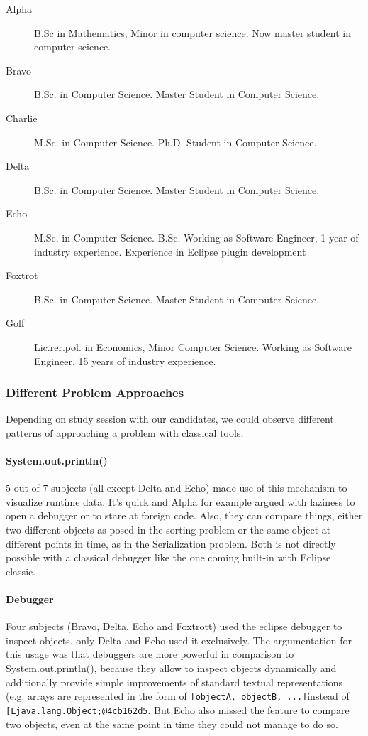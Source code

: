 \documentclass[english]{acm_proc_article-sp}
\newcommand\nes[1]{\nbc{nes}{#1}{blue}}
\begin{document}
\nes{Todo: reduce white space.}
\begin{description}
\item [{Alpha}] B.Sc in Mathematics, Minor in computer science. Now master student in computer science. %
\item [{Bravo}] B.Sc. in Computer Science. Master Student  in Computer Science.
\item [{Charlie}] M.Sc. in Computer Science. Ph.D. Student in Computer Science.
\item [{Delta}] B.Sc. in Computer Science. Master Student  in Computer Science.
\item [{Echo}] M.Sc. in Computer Science. B.Sc. Working as Software Engineer, 1 year of industry experience. Experience in Eclipse plugin development
\item [{Foxtrot}] B.Sc. in Computer Science. Master Student  in Computer Science.
\item [{Golf}] Lic.rer.pol. in Economics, Minor Computer Science. Working as Software Engineer, 15 years of industry experience. %
\end{description}

\subsubsection{Different Problem Approaches}
Depending on study session with our candidates, we could observe different patterns of approaching a problem with classical tools.
\paragraph{System.out.println()}
5 out of 7 subjects (all except Delta and Echo) made use of this mechanism to visualize runtime data. 
It's quick and Alpha for example argued with laziness to open a debugger or to stare at foreign code. 
Also, they can compare things, either two different objects as posed in the sorting problem or the same object at different points in time, as in the Serialization problem. 
Both is not directly possible with a classical debugger like the one coming built-in with Eclipse classic.
\paragraph{Debugger}
Four subjects (Bravo, Delta, Echo and Foxtrott) used the eclipse debugger to inspect objects, only Delta and Echo used it exclusively. 
The argumentation for this usage was that debuggers are more powerful in comparison to System.out.println(), because they allow to inspect objects dynamically and additionally provide simple improvements of standard textual representations (e.g. 
arrays are represented in the form of \texttt{[objectA, objectB, ...]}instead of \texttt{[Ljava.lang.Object;@4cb162d5}. 
But Echo also missed the feature to compare two objects, even at the same point in time they could not manage to do so.
\end{document}
